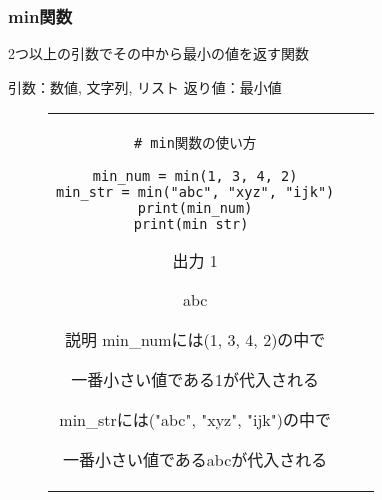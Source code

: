 \documentclass{jsarticle}
\begin{document}
\subsubsection{min関数}
2つ以上の引数でその中から最小の値を返す関数 \par
引数：数値, 文字列, リスト \hspace{5mm}
返り値：最小値
\vspace{-5mm}
\begin{figure}[h]
	\begin{tabular}{ccc}
		\begin{minipage}[t]{.4\textwidth}
			\begin{lstlisting}[caption=min関数]
# min関数の使い方

min_num = min(1, 3, 4, 2)
min_str = min("abc", "xyz", "ijk")
print(min_num)
print(min_str) \end{lstlisting}
		\end{minipage} \hspace{5mm}
		\begin{minipage}[t]{.1\textwidth}
			\begin{itembox}[l]{出力}
				1 \par
				abc \par
			\end{itembox}
		\end{minipage} \hspace{5mm}
		\begin{minipage}[t]{.45\textwidth}
			\begin{itembox}[l]{説明}
				min\_numには(1, 3, 4, 2)の中で\par 一番小さい値である1が代入される \par
				min\_strには("abc", "xyz", "ijk")の中で\par 一番小さい値であるabcが代入される \par
			\end{itembox}
		\end{minipage}
	\end{tabular}
\end{figure}

\end{document}
